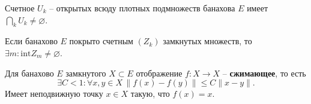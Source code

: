 
\begin{to_thr}
	Счетное ${U_k}$ -- открытых всюду плотных подмножеств банахова $E$ имеет $\bigcap_k U_k \neq \varnothing$.
\end{to_thr}

\begin{to_con}
	Если банахово $E$ покрыто счетным $(Z_k)$ замкнутых множеств, то $\exists m \colon \text{int}Z_m \neq \varnothing$.
\end{to_con}

\begin{to_thr}
	Для банахово $E$ замкнутого $X \subset E$ отображение $f \colon X \to X$ -- \textbf{сжимающее}, то есть
	\begin{equation*}
	 	\exists C <1 \colon \forall x,y \in X \, \|f(x) - f(y)\| \leq C\|x-y\|.
	 \end{equation*} 
	 Имеет неподвижную точку $x \in X$ такую, что $f(x) = x$.
\end{to_thr}